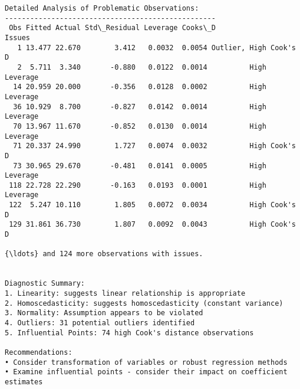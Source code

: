 \documentclass[8pt, twocolumn]{extarticle}
\begin{document}
    \begin{Verbatim}[commandchars=\\\{\}]
Detailed Analysis of Problematic Observations:
--------------------------------------------------
 Obs Fitted Actual Std\_Residual Leverage Cooks\_D                 Issues
   1 13.477 22.670        3.412   0.0032  0.0054 Outlier, High Cook's D
   2  5.711  3.340       -0.880   0.0122  0.0014          High Leverage
  14 20.959 20.000       -0.356   0.0128  0.0002          High Leverage
  36 10.929  8.700       -0.827   0.0142  0.0014          High Leverage
  70 13.967 11.670       -0.852   0.0130  0.0014          High Leverage
  71 20.337 24.990        1.727   0.0074  0.0032          High Cook's D
  73 30.965 29.670       -0.481   0.0141  0.0005          High Leverage
 118 22.728 22.290       -0.163   0.0193  0.0001          High Leverage
 122  5.247 10.110        1.805   0.0072  0.0034          High Cook's D
 129 31.861 36.730        1.807   0.0092  0.0043          High Cook's D

{\ldots} and 124 more observations with issues.


Diagnostic Summary:
1. Linearity: suggests linear relationship is appropriate
2. Homoscedasticity: suggests homoscedasticity (constant variance)
3. Normality: Assumption appears to be violated
4. Outliers: 31 potential outliers identified
5. Influential Points: 74 high Cook's distance observations

Recommendations:
• Consider transformation of variables or robust regression methods
• Examine influential points - consider their impact on coefficient estimates
    \end{Verbatim}
\end{document}
